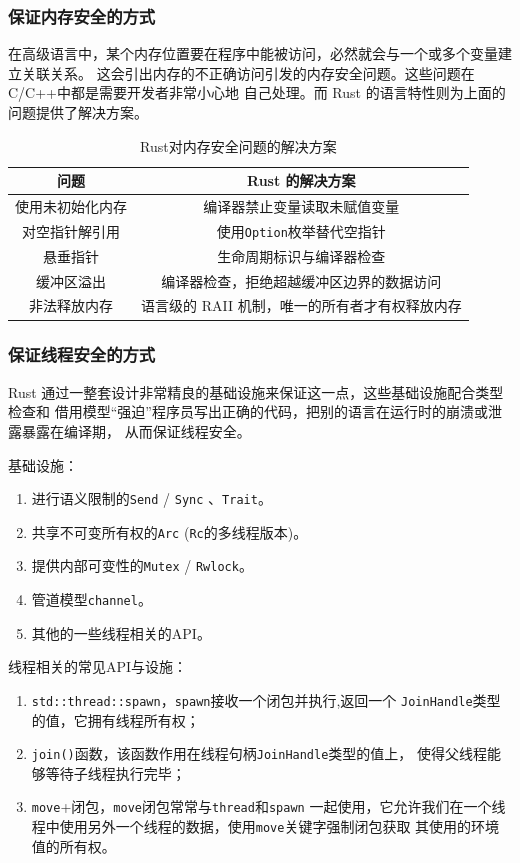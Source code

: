 \documentclass{../runikraft-report}
\begin{document}
\subsubsection{保证内存安全的方式}
在高级语言中，某个内存位置要在程序中能被访问，必然就会与一个或多个变量建立关联关系。
这会引出内存的不正确访问引发的内存安全问题。这些问题在C/C++中都是需要开发者非常小心地
自己处理。而 Rust 的语言特性则为上面的问题提供了解决方案。\cite{8}
\begin{table}[H]
\centering
\caption{Rust对内存安全问题的解决方案}
\begin{tabular}{|c|c|}
\hline
\textbf{问题} & \textbf{Rust 的解决方案}\\\hline
使用未初始化内存&编译器禁止变量读取未赋值变量\\\hline
对空指针解引用&使用\texttt{Option}枚举替代空指针\\\hline
悬垂指针&生命周期标识与编译器检查\\\hline
缓冲区溢出&编译器检查，拒绝超越缓冲区边界的数据访问\\\hline
非法释放内存&语言级的 RAII 机制，唯一的所有者才有权释放内存\\\hline
\end{tabular}
\end{table}
\subsubsection{保证线程安全的方式}
Rust 通过一整套设计非常精良的基础设施来保证这一点，这些基础设施配合类型检查和
借用模型“强迫”程序员写出正确的代码，把别的语言在运行时的崩溃或泄露暴露在编译期，
从而保证线程安全。

\noindent 基础设施：

\begin{enumerate}
\item 进行语义限制的\texttt{Send} / \texttt{Sync} 、\texttt{Trait}。
\item 共享不可变所有权的\texttt{Arc} (\texttt{Rc}的多线程版本)。
\item 提供内部可变性的\texttt{Mutex} / \texttt{Rwlock}。
\item 管道模型\texttt{channel}。
\item 其他的一些线程相关的API。
\end{enumerate}

\noindent 线程相关的常见API与设施：

\begin{enumerate}
\item \texttt{std::thread::spawn}，\texttt{spawn}接收一个闭包并执行,返回一个
\texttt{JoinHandle}类型的值，它拥有线程所有权；
\item  \texttt{join()}函数，该函数作用在线程句柄\texttt{JoinHandle}类型的值上，
使得父线程能够等待子线程执行完毕；
\item \texttt{move}+闭包，\texttt{move}闭包常常与\texttt{thread}和\texttt{spawn}
一起使用，它允许我们在一个线程中使用另外一个线程的数据，使用\texttt{move}关键字强制闭包获取
其使用的环境值的所有权。
\end{enumerate}
\end{document}

